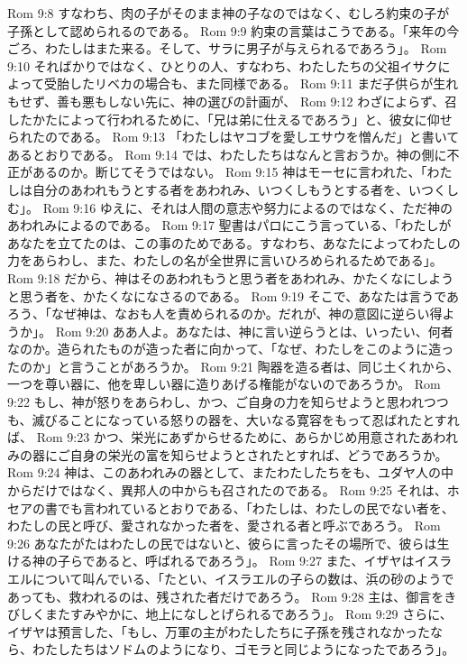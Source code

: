 Rom 9:8  すなわち、肉の子がそのまま神の子なのではなく、むしろ約束の子が子孫として認められるのである。
Rom 9:9  約束の言葉はこうである。「来年の今ごろ、わたしはまた来る。そして、サラに男子が与えられるであろう」。
Rom 9:10  そればかりではなく、ひとりの人、すなわち、わたしたちの父祖イサクによって受胎したリベカの場合も、また同様である。
Rom 9:11  まだ子供らが生れもせず、善も悪もしない先に、神の選びの計画が、
Rom 9:12  わざによらず、召したかたによって行われるために、「兄は弟に仕えるであろう」と、彼女に仰せられたのである。
Rom 9:13  「わたしはヤコブを愛しエサウを憎んだ」と書いてあるとおりである。
Rom 9:14  では、わたしたちはなんと言おうか。神の側に不正があるのか。断じてそうではない。
Rom 9:15  神はモーセに言われた、「わたしは自分のあわれもうとする者をあわれみ、いつくしもうとする者を、いつくしむ」。
Rom 9:16  ゆえに、それは人間の意志や努力によるのではなく、ただ神のあわれみによるのである。
Rom 9:17  聖書はパロにこう言っている、「わたしがあなたを立てたのは、この事のためである。すなわち、あなたによってわたしの力をあらわし、また、わたしの名が全世界に言いひろめられるためである」。
Rom 9:18  だから、神はそのあわれもうと思う者をあわれみ、かたくなにしようと思う者を、かたくなになさるのである。
Rom 9:19  そこで、あなたは言うであろう、「なぜ神は、なおも人を責められるのか。だれが、神の意図に逆らい得ようか」。
Rom 9:20  ああ人よ。あなたは、神に言い逆らうとは、いったい、何者なのか。造られたものが造った者に向かって、「なぜ、わたしをこのように造ったのか」と言うことがあろうか。
Rom 9:21  陶器を造る者は、同じ土くれから、一つを尊い器に、他を卑しい器に造りあげる権能がないのであろうか。
Rom 9:22  もし、神が怒りをあらわし、かつ、ご自身の力を知らせようと思われつつも、滅びることになっている怒りの器を、大いなる寛容をもって忍ばれたとすれば、
Rom 9:23  かつ、栄光にあずからせるために、あらかじめ用意されたあわれみの器にご自身の栄光の富を知らせようとされたとすれば、どうであろうか。
Rom 9:24  神は、このあわれみの器として、またわたしたちをも、ユダヤ人の中からだけではなく、異邦人の中からも召されたのである。
Rom 9:25  それは、ホセアの書でも言われているとおりである、「わたしは、わたしの民でない者を、わたしの民と呼び、愛されなかった者を、愛される者と呼ぶであろう。
Rom 9:26  あなたがたはわたしの民ではないと、彼らに言ったその場所で、彼らは生ける神の子らであると、呼ばれるであろう」。
Rom 9:27  また、イザヤはイスラエルについて叫んでいる、「たとい、イスラエルの子らの数は、浜の砂のようであっても、救われるのは、残された者だけであろう。
Rom 9:28  主は、御言をきびしくまたすみやかに、地上になしとげられるであろう」。
Rom 9:29  さらに、イザヤは預言した、「もし、万軍の主がわたしたちに子孫を残されなかったなら、わたしたちはソドムのようになり、ゴモラと同じようになったであろう」。
